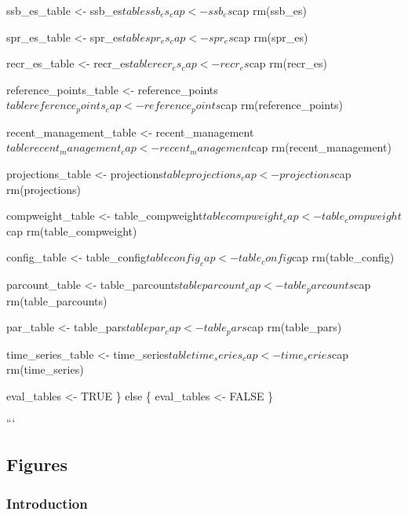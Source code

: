 \documentclass[
]{scrartcl}
\begin{document}
ssb\_es\_table \textless- ssb\_es\(table
  ssb_es_cap <- ssb_es\)cap rm(ssb\_es)

spr\_es\_table \textless- spr\_es\(table
  spr_es_cap <- spr_es\)cap rm(spr\_es)

recr\_es\_table \textless- recr\_es\(table
  recr_es_cap <- recr_es\)cap rm(recr\_es)

reference\_points\_table \textless- reference\_points\(table
  reference_points_cap <- reference_points\)cap rm(reference\_points)

recent\_management\_table \textless- recent\_management\(table
  recent_management_cap <- recent_management\)cap rm(recent\_management)

projections\_table \textless- projections\(table
  projections_cap <- projections\)cap rm(projections)

compweight\_table \textless- table\_compweight\(table
  compweight_cap <- table_compweight\)cap rm(table\_compweight)

config\_table \textless- table\_config\(table
  config_cap <- table_config\)cap rm(table\_config)

parcount\_table \textless- table\_parcounts\(table
  parcount_cap <- table_parcounts\)cap rm(table\_parcounts)

par\_table \textless- table\_pars\(table
  par_cap <- table_pars\)cap rm(table\_pars)

time\_series\_table \textless- time\_series\(table
  time_series_cap <- time_series\)cap rm(time\_series)

eval\_tables \textless- TRUE \} else \{ eval\_tables \textless- FALSE \}

```

\newpage{}

\subsection{Figures}\label{figures}

\subsubsection{Introduction}\label{introduction-1}
\end{document}
